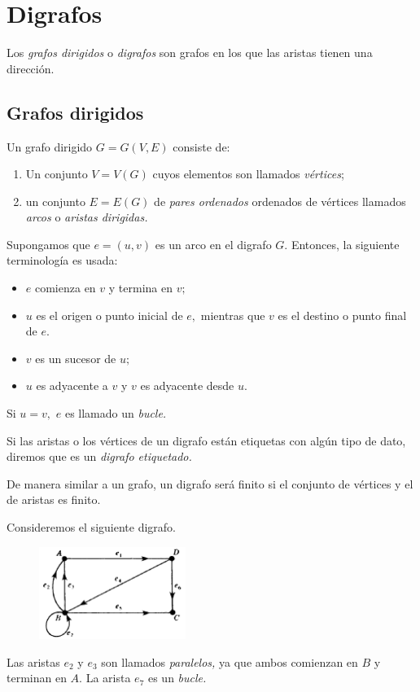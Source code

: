 \section{Digrafos}


Los \emph{grafos dirigidos} o \emph{digrafos} son grafos en los que las aristas tienen una dirección.


\subsection{Grafos dirigidos}


Un grafo dirigido $G=G(V,E)$ consiste de:
\begin{enumerate}
	\item Un conjunto $V=V(G)$ cuyos elementos son llamados \emph{v\'ertices};
	\item un conjunto $E=E(G)$ de \emph{pares ordenados} ordenados de v\'ertices llamados \emph{arcos} o \emph{aristas dirigidas.}
\end{enumerate}




Supongamos que $e=(u,v)$ es un arco en el digrafo $G.$ Entonces, la siguiente terminología es usada:
\begin{itemize}
	\item $e$ comienza en $v$ y termina en $v;$
	\item $u$ es el origen o punto inicial de $e,$ mientras que $v$ es el destino o punto final de $e.$
	\item $v$ es un sucesor de $u;$
	\item $u$ es adyacente a $v$ y $v$ es adyacente desde $u.$
\end{itemize}


Si $u=v,$ $e$ es llamado un \emph{bucle.}



Si las aristas o los v\'ertices de un digrafo están etiquetas con algún tipo de dato, diremos que es un \emph{digrafo etiquetado.}


De manera similar a un grafo, un digrafo será finito si el conjunto de v\'ertices y el de aristas es finito.



\begin{problema}
	Consideremos el siguiente digrafo.
	\begin{figure}[h]
		\centering
		\includegraphics[height=3cm,keepaspectratio=true]{./md/fig0901a.png}
		\label{fig:0901a}
	\end{figure}
	Las aristas $e_{2}$ y $e_{3}$ son llamados \emph{paralelos,} ya que ambos comienzan en $B$ y terminan en $A.$ La arista $e_{7}$ es un \emph{bucle.}
\end{problema}




